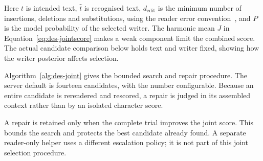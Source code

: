 Here $t$ is intended text, $\widehat t$ is recognised text, $d_{\mathrm{edit}}$ is the minimum number of insertions, deletions and substitutions, using the reader error convention~\cite[p.~2]{graves2006}, and $P$ is the model probability of the selected writer. The harmonic mean $J$ in Equation~\ref{eq:des-jointscore} makes a weak component limit the combined score. The actual candidate comparison below holds text and writer fixed, showing how the writer posterior affects selection.

Algorithm~\ref{alg:des-joint} gives the bounded search and repair procedure. The server default is fourteen candidates, with the number configurable. Because an entire candidate is rerendered and rescored, a repair is judged in its assembled context rather than by an isolated character score.

\begin{designalgorithm}
\caption{Joint candidate search and bounded legibility repair}
\label{alg:des-joint}
\begin{designpseudo}
\end{designpseudo}
\end{designalgorithm}

A repair is retained only when the complete trial improves the joint score. This bounds the search and protects the best candidate already found. A separate reader-only helper uses a different escalation policy; it is not part of this joint selection procedure.

